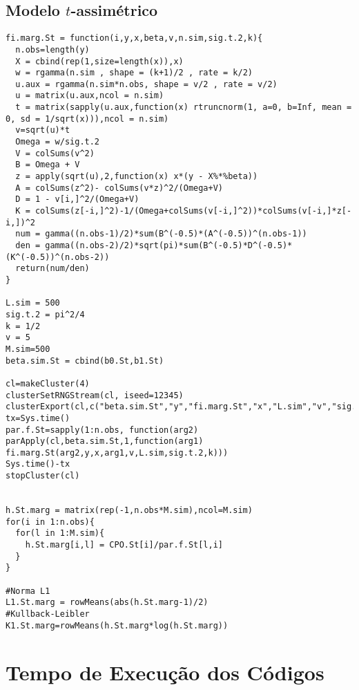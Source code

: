\subsection{Modelo $t$-assimétrico}
\begin{lstlisting}
fi.marg.St = function(i,y,x,beta,v,n.sim,sig.t.2,k){
  n.obs=length(y)
  X = cbind(rep(1,size=length(x)),x)
  w = rgamma(n.sim , shape = (k+1)/2 , rate = k/2)
  u.aux = rgamma(n.sim*n.obs, shape = v/2 , rate = v/2)
  u = matrix(u.aux,ncol = n.sim)
  t = matrix(sapply(u.aux,function(x) rtruncnorm(1, a=0, b=Inf, mean = 0, sd = 1/sqrt(x))),ncol = n.sim)
  v=sqrt(u)*t
  Omega = w/sig.t.2
  V = colSums(v^2)
  B = Omega + V
  z = apply(sqrt(u),2,function(x) x*(y - X%*%beta))
  A = colSums(z^2)- colSums(v*z)^2/(Omega+V)
  D = 1 - v[i,]^2/(Omega+V)
  K = colSums(z[-i,]^2)-1/(Omega+colSums(v[-i,]^2))*colSums(v[-i,]*z[-i,])^2
  num = gamma((n.obs-1)/2)*sum(B^(-0.5)*(A^(-0.5))^(n.obs-1))
  den = gamma((n.obs-2)/2)*sqrt(pi)*sum(B^(-0.5)*D^(-0.5)*(K^(-0.5))^(n.obs-2))
  return(num/den)
}

L.sim = 500
sig.t.2 = pi^2/4
k = 1/2
v = 5
M.sim=500
beta.sim.St = cbind(b0.St,b1.St)

cl=makeCluster(4)
clusterSetRNGStream(cl, iseed=12345)
clusterExport(cl,c("beta.sim.St","y","fi.marg.St","x","L.sim","v","sig.t.2","k","rtruncnorm","n.obs"))
tx=Sys.time()
par.f.St=sapply(1:n.obs, function(arg2) parApply(cl,beta.sim.St,1,function(arg1) fi.marg.St(arg2,y,x,arg1,v,L.sim,sig.t.2,k)))
Sys.time()-tx
stopCluster(cl)


h.St.marg = matrix(rep(-1,n.obs*M.sim),ncol=M.sim)
for(i in 1:n.obs){
  for(l in 1:M.sim){
    h.St.marg[i,l] = CPO.St[i]/par.f.St[l,i]
  }
}

#Norma L1
L1.St.marg = rowMeans(abs(h.St.marg-1)/2)
#Kullback-Leibler
K1.St.marg=rowMeans(h.St.marg*log(h.St.marg))
\end{lstlisting}

\section{Tempo de Execução dos Códigos}

